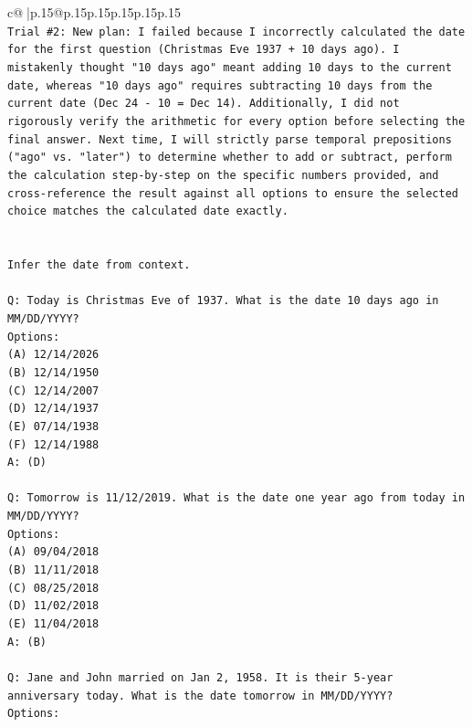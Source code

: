 \documentclass{article}
\begin{document}
{\begin{supertabular}{c@{$\;$}|p{.15\linewidth}@{}p{.15\linewidth}p{.15\linewidth}p{.15\linewidth}p{.15\linewidth}p{.15\linewidth}}
{{{\\ 
\texttt{Trial \#2: New plan: I failed because I incorrectly calculated the date for the first question (Christmas Eve 1937 + 10 days ago). I mistakenly thought "10 days ago" meant adding 10 days to the current date, whereas "10 days ago" requires subtracting 10 days from the current date (Dec 24 {-} 10 = Dec 14). Additionally, I did not rigorously verify the arithmetic for every option before selecting the final answer. Next time, I will strictly parse temporal prepositions ("ago" vs. "later") to determine whether to add or subtract, perform the calculation step{-}by{-}step on the specific numbers provided, and cross{-}reference the result against all options to ensure the selected choice matches the calculated date exactly.} \\
\\ 
\\ 
\texttt{Infer the date from context.} \\
\\ 
\texttt{Q: Today is Christmas Eve of 1937. What is the date 10 days ago in MM/DD/YYYY?} \\
\texttt{Options:} \\
\texttt{(A) 12/14/2026} \\
\texttt{(B) 12/14/1950} \\
\texttt{(C) 12/14/2007} \\
\texttt{(D) 12/14/1937} \\
\texttt{(E) 07/14/1938} \\
\texttt{(F) 12/14/1988} \\
\texttt{A: (D)} \\
\\ 
\texttt{Q: Tomorrow is 11/12/2019. What is the date one year ago from today in MM/DD/YYYY?} \\
\texttt{Options:} \\
\texttt{(A) 09/04/2018} \\
\texttt{(B) 11/11/2018} \\
\texttt{(C) 08/25/2018} \\
\texttt{(D) 11/02/2018} \\
\texttt{(E) 11/04/2018} \\
\texttt{A: (B)} \\
\\ 
\texttt{Q: Jane and John married on Jan 2, 1958. It is their 5{-}year anniversary today. What is the date tomorrow in MM/DD/YYYY?} \\
\texttt{Options:} \\
}}}
\end{supertabular}}
\end{document}
